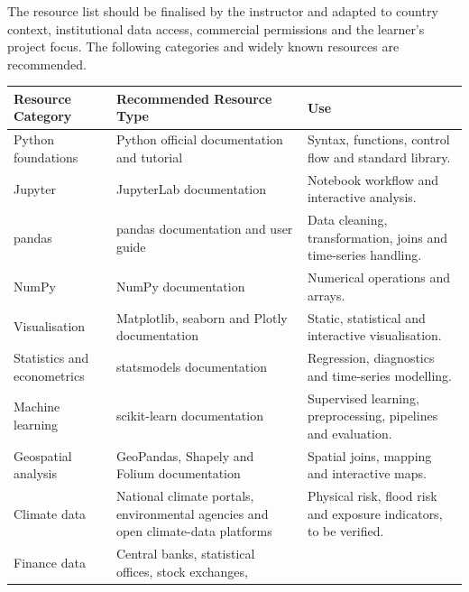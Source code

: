 \documentclass[
  a4paper,
]{article}
\newcounter{none} %
\begin{document}
The resource list should be finalised by the instructor and adapted to
country context, institutional data access, commercial permissions and
the learner's project focus. The following categories and widely known
resources are recommended.

{\def\LTcaptype{none} %
\begin{longtable}[]{@{}
  >{\raggedright\arraybackslash}p{}
  >{\raggedright\arraybackslash}p{}
  >{\raggedright\arraybackslash}p{}@{}}
\toprule\noalign{}
\begin{minipage}[b]{\linewidth}\raggedright
Resource Category
\end{minipage} & \begin{minipage}[b]{\linewidth}\raggedright
Recommended Resource Type
\end{minipage} & \begin{minipage}[b]{\linewidth}\raggedright
Use
\end{minipage} \\
\midrule\noalign{}
\endhead
\bottomrule\noalign{}
\endlastfoot
Python foundations & Python official documentation and tutorial &
Syntax, functions, control flow and standard library. \\
Jupyter & JupyterLab documentation & Notebook workflow and interactive
analysis. \\
pandas & pandas documentation and user guide & Data cleaning,
transformation, joins and time-series handling. \\
NumPy & NumPy documentation & Numerical operations and arrays. \\
Visualisation & Matplotlib, seaborn and Plotly documentation & Static,
statistical and interactive visualisation. \\
Statistics and econometrics & statsmodels documentation & Regression,
diagnostics and time-series modelling. \\
Machine learning & scikit-learn documentation & Supervised learning,
preprocessing, pipelines and evaluation. \\
Geospatial analysis & GeoPandas, Shapely and Folium documentation &
Spatial joins, mapping and interactive maps. \\
Climate data & National climate portals, environmental agencies and open
climate-data platforms & Physical risk, flood risk and exposure
indicators, to be verified. \\
Finance data & Central banks, statistical offices, stock exchanges,

\end{longtable}}
\end{document}
